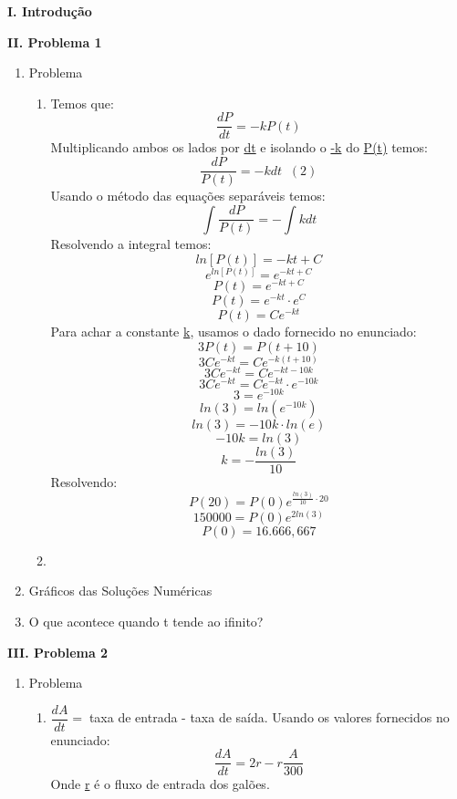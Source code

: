\documentclass[a4paper, 12pt]{article}
\begin{document}
	\begin{flushleft}		
		\textbf{I. Introdução}
		\item
		\textbf{II. Problema 1}
		\begin{enumerate}
			\item
				Problema
				\begin{enumerate}
					\item
						Temos que:
						$$\dfrac{dP}{dt} = -kP(t)$$
						Multiplicando ambos os lados por \underline{dt} e isolando o \underline{-k} do \underline{P(t)} temos:
						$$\dfrac{dP}{P(t)} = -kdt \;\;(2)$$
						Usando o método das equações separáveis temos:
						$$\int\dfrac{dP}{P(t)} = -\int kdt$$
						Resolvendo a integral temos:
						$$ln[P(t)] = -kt+C$$
						$$\textit{e}^{ln[P(t)]} = \textit{e}^{-kt+C}$$
						$$P(t) = \textit{e}^{-kt+C}$$
						$$P(t) = \textit{e}^{-kt}\cdot\textit{e}^C$$
						$$P(t) = C\textit{e}^{-kt}$$
						Para achar a constante \underline{k}, usamos o dado fornecido no enunciado:
						$$3P(t) = P(t+10)$$
						$$3C\textit{e}^{-kt} = C\textit{e}^{-k(t+10)}$$
						$$3C\textit{e}^{-kt} = C\textit{e}^{-kt-10k}$$
						$$3C\textit{e}^{-kt} = C\textit{e}^{-kt}\cdot\textit{e}^{-10k}$$
						$$3 = \textit{e}^{-10k}$$
						$$ln (3) = ln(\textit{e}^{-10k})$$
						$$ln (3) = -10k\cdot ln(\textit{e})$$
						$$-10k = ln(3)$$
						$$k = -\dfrac{ln (3)}{10}$$
						Resolvendo:
						$$P(20) = P(0)e^{\frac{ln (3)}{10}\cdot 20}$$
						$$150000 = P(0)e^{2ln(3)}$$
						$$P(0) = 16.666,667$$
					\item
				\end{enumerate}
			\item
				Gráficos das Soluções Numéricas
			\item
				O que acontece quando t tende ao ifinito?
		\end{enumerate}
		\textbf{III. Problema 2}
		\begin{enumerate}
			\item
				Problema
				\begin{enumerate}
					\item
						$\dfrac{dA}{dt} =\;$taxa de entrada - taxa de saída. Usando os valores fornecidos no enunciado:					
						$$\dfrac{dA}{dt} = 2r - r\dfrac{A}{300}$$
						Onde \underline{r} é o fluxo de entrada dos galões.
						

\end{enumerate}
\end{enumerate}
\end{flushleft}
\end{document}
